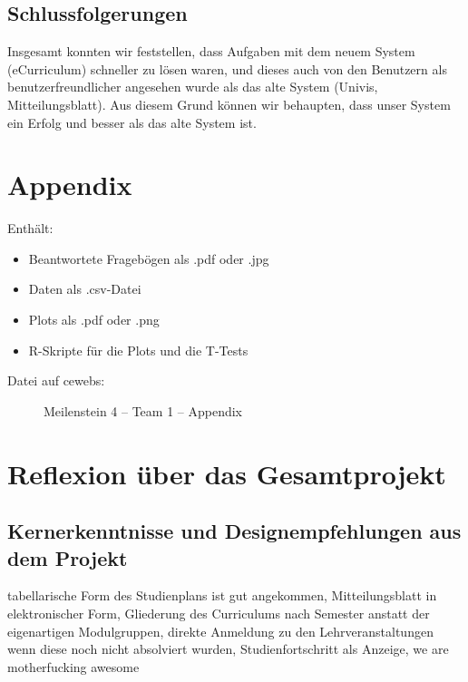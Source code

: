 \documentclass[a4paper,10pt]{scrartcl}
\begin{document}
\subsection{Schlussfolgerungen}

Insgesamt konnten wir feststellen, dass Aufgaben mit dem neuem System (eCurriculum) schneller zu lösen waren, und dieses auch von
den Benutzern als benutzerfreundlicher angesehen wurde als das alte System (Univis, Mitteilungsblatt). Aus diesem Grund können
wir behaupten, dass unser System ein Erfolg und besser als das alte System ist.

\section{Appendix}

Enthält:

\begin{itemize}
 \item Beantwortete Fragebögen als .pdf oder .jpg
 \item Daten als .csv-Datei
 \item Plots als .pdf oder .png
 \item R-Skripte für die Plots und die T-Tests
\end{itemize}


\begin{description}
 \item[Datei auf cewebs:] Meilenstein 4 -- Team 1 -- Appendix
\end{description}

\section{Reflexion über das Gesamtprojekt}

\subsection{Kernerkenntnisse und Designempfehlungen aus dem Projekt}

% 

tabellarische Form des Studienplans ist gut angekommen, Mitteilungsblatt in elektronischer Form, Gliederung des Curriculums nach Semester anstatt der eigenartigen
Modulgruppen, direkte Anmeldung zu den Lehrveranstaltungen wenn diese noch nicht absolviert wurden, Studienfortschritt als Anzeige, we are motherfucking awesome
\end{document}
